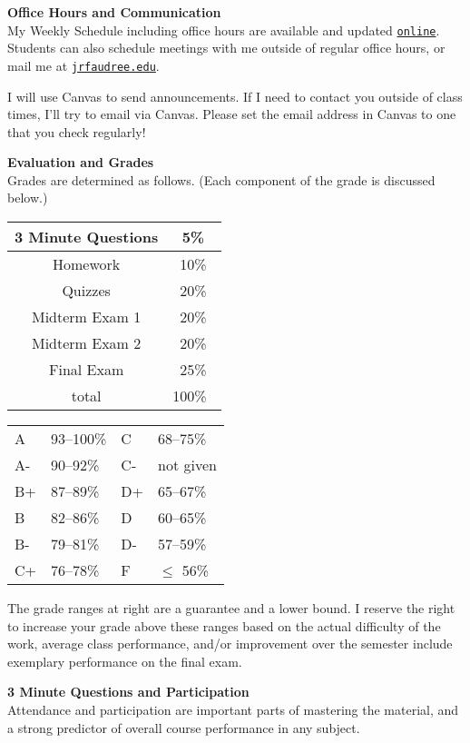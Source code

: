\documentclass[12pt]{article}
\renewcommand{\emph}[1]{\textsf{\textbf{#1}}}
\newcommand{\localhead}[1]{\par\smallskip\textbf{#1} \smallskip\nobreak\\}%
\def\heading#1{\localhead{\large\emph{#1}}}
\begin{document}
\heading{Office Hours and Communication}
My Weekly Schedule including office hours are available and updated \href{https://docs.google.com/spreadsheets/d/e/2PACX-1vSPkx0I1WQikJjmR8qs8wpf2oWcwO8CFS2VwCZYsdusMDkxTIQuOVwcV8LfAtsDtUGoj49xCS1mOIrW/pubhtml}{\texttt{online}}.  Students can also schedule meetings with me outside of regular office hours, or mail me at \href{mailto:jrfaudree@alaska.edu}{\texttt{jrfaudree\@@alaska.edu}}.

I will use Canvas to send announcements.  If I need to contact you outside of class times, I'll try to email via Canvas.  Please set the email address in Canvas to one that you check regularly!


\heading{Evaluation and Grades}
Grades are determined as follows.  (Each component of the grade is discussed below.)
 
\begin{multicols}{2}
\begin{tabular}{|c|c|}
\hline
3 Minute Questions & 5\%\\
\hline
Homework & 10\% \\
\hline
Quizzes & 20\% \\
\hline
Midterm Exam 1 & 20\% \\
\hline
Midterm Exam 2 & 20\%  \\
\hline
Final Exam & 25\% \\
\hline
total & 100\% \, \\
\hline
\end{tabular}


\begin{tabular}{llll}
A  & 93--100\%& C  & 68--75\%  \\
A- & 90--92\% & C- & not given \\
B+ & 87--89\% & D+ & 65--67\%  \\
B  & 82--86\% & D  & 60--65\%  \\
B- & 79--81\% & D- & 57--59\%  \\
C+ & 76--78\% & F  & $\le$ 56\%
\end{tabular}
\end{multicols}

The grade ranges at right are a guarantee and a lower bound. I reserve the right to increase your grade above these ranges based on the actual difficulty of the work, average class performance, and/or improvement over the semester include exemplary performance on the final exam. 

\heading{3 Minute Questions and Participation}
Attendance and participation are important parts of mastering the material, and a strong predictor of overall course performance in any subject.
\end{document}
